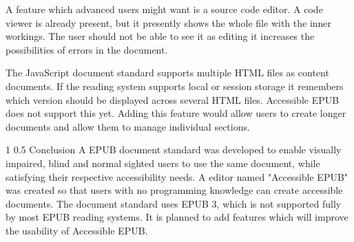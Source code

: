 \documentclass{llncs}
\makeatletter
\renewcommand\section{\@startsection 
   {section}{1}{0mm}%
   {1\baselineskip}%
   {0.5\baselineskip}%
   {\bfseries\Large}%
   }
\makeatother
\begin{document}
A feature which advanced users might want is a source code editor. A code viewer is already present, but it presently shows the whole file with the inner workings. The user should not be able to see it as editing it increases the possibilities of errors in the document.

The JavaScript document standard supports multiple HTML files as content documents. If the reading system supports local or session storage it remembers which version should be displayed across several HTML files. Accessible EPUB does not support this yet. Adding this feature would allow users to create longer documents and allow them to manage individual sections.

\section{Conclusion}
A EPUB document standard was developed to enable visually impaired, blind and normal sighted users to use the same document, while satisfying their respective accessibility needs. A editor named "Accessible EPUB" was created so that users with no programming knowledge can create accessible documents. The document standard uses EPUB 3, which is not supported fully by most EPUB reading systems.
It is planned to add features which will improve the usability of Accessible EPUB.

%
%
\end{document}
